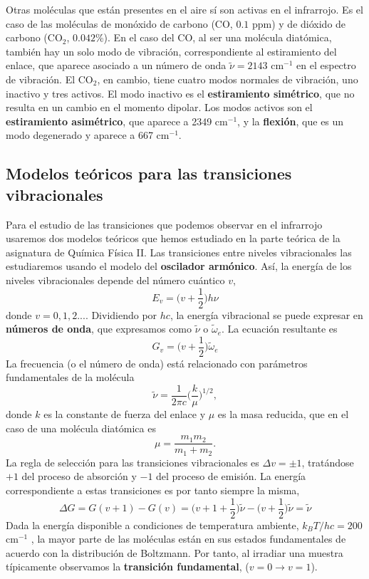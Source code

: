\documentclass{tufte-handout}
\begin{document}
Otras moléculas que están 
presentes en el aire sí son activas en el infrarrojo. Es el caso de las 
moléculas de monóxido de carbono (CO, $0.1$ ppm) y de dióxido de carbono (CO$_2$, $0.042$\%).
En el caso del CO, al ser una molécula diatómica, también hay un solo modo de vibración,
correspondiente al estiramiento del enlace, que aparece asociado a un 
número de onda $\tilde{\nu}=2143$ cm$^{-1}$
en el espectro de vibración. El CO$_2$, en cambio, tiene cuatro modos 
normales de vibración, uno inactivo y tres activos. El modo inactivo es el 
\textbf{estiramiento simétrico}, que no resulta en un cambio en el momento
dipolar. Los modos activos son el \textbf{estiramiento asimétrico}, que
aparece a 2349 cm$^{-1}$, y la \textbf{flexión}, que es un modo degenerado y
aparece a 667 cm$^{-1}$.

\subsection{Modelos teóricos para las transiciones vibracionales}
Para el estudio de las transiciones que podemos observar en el infrarrojo
usaremos dos modelos teóricos que hemos estudiado en la parte teórica de la
asignatura de Química Física II. Las transiciones entre niveles 
vibracionales las estudiaremos usando el modelo del \textbf{oscilador
armónico}. Así, la energía de los niveles vibracionales depende del 
número cuántico $v$,
\begin{equation}
    E_v=\bigg(v+\frac{1}{2}\bigg)h\nu
\end{equation}
donde $v=0,1,2...$. 
Dividiendo por $hc$, la energía vibracional se puede expresar en 
\textbf{números de onda}, que expresamos como $\tilde{\nu}$ o
$\tilde{\omega}_e$. La ecuación resultante es
\begin{equation}
    G_v=\bigg(v+\frac{1}{2}\bigg)\tilde{\omega}_e
\end{equation}
La frecuencia (o el número de onda) está relacionado con parámetros
fundamentales de la molécula
\begin{equation}
    \tilde{\nu}=\frac{1}{2\pi c}\Big(\frac{k}{\mu}\Big)^{1/2},
    \label{eq:nu}
\end{equation}
donde $k$ es la constante de fuerza del enlace y $\mu$ es la masa 
reducida, que en el caso de una molécula diatómica es 
\begin{equation}
    \mu=\frac{m_1m_2}{m_1+m_2}.
\end{equation}
La regla de selección para las transiciones vibracionales es 
$\Delta v=\pm 1$, tratándose $+1$ del proceso de absorción 
y $-1$ del proceso de emisión. La energía correspondiente a
estas transiciones es por tanto siempre la misma, 
\begin{equation}
    \Delta G=G(v+1)-G(v) = \bigg(v+1+\frac{1}{2}\bigg)\tilde{\nu} -
     \bigg(v+\frac{1}{2}\bigg)\tilde{\nu} = \tilde{\nu}
\end{equation}
Dada la energía disponible a condiciones de temperatura 
ambiente, $k_BT/hc=200$ cm$^{-1}$ , la mayor parte de las 
moléculas están en sus estados fundamentales de acuerdo con
la distribución de Boltzmann. Por tanto, al irradiar una 
muestra típicamente observamos la \textbf{transición fundamental}, 
($v=0\rightarrow v=1$).
\end{document}
